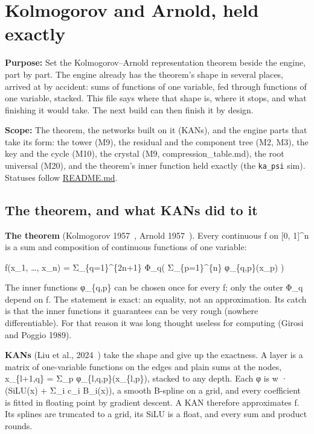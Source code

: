 \chapter{\texorpdfstring{Kolmogorov and Arnold, held exactly}{Kolmogorov and Arnold, held exactly}}
\label{chap:kolmogorov-arnold}

\textbf{Purpose:} Set the Kolmogorov–Arnold representation theorem beside the engine, part by part. The engine already has the theorem's shape in several places, arrived at by accident: sums of functions of one variable, fed through functions of one variable, stacked. This file says where that shape is, where it stops, and what finishing it would take. The next build can then finish it by design.

\textbf{Scope:} The theorem, the networks built on it (KANs), and the engine parts that take its form: the tower (M9), the residual and the component tree (M2, M3), the key and the cycle (M10), the crystal (M9, compression\_\allowbreak{}table.md), the root universal (M20), and the theorem's inner function held exactly (the \texttt{ka\_\allowbreak{}psi} sim). Statuses follow \hyperref[chap:readme]{README.md}.

\section{\texorpdfstring{The theorem, and what KANs did to it}{The theorem, and what KANs did to it}}

\textbf{The theorem} (Kolmogorov 1957~\cite{src:Kolmogorov-1957}, Arnold 1957~\cite{src:Arnold-1957}). Every continuous f on [0, 1]\textasciicircum{}n is a sum and composition of continuous functions of one variable:

f(x\_\allowbreak{}1, …, x\_\allowbreak{}n) = Σ\_\allowbreak{}\{q=1\}\textasciicircum{}\{2n+1\} Φ\_\allowbreak{}q( Σ\_\allowbreak{}\{p=1\}\textasciicircum{}\{n\} φ\_\allowbreak{}\{q,p\}(x\_\allowbreak{}p) )

The inner functions φ\_\allowbreak{}\{q,p\} can be chosen once for every f; only the outer Φ\_\allowbreak{}q depend on f. The statement is exact: an equality, not an approximation. Its catch is that the inner functions it guarantees can be very rough (nowhere differentiable). For that reason it was long thought useless for computing (Girosi and Poggio 1989).

\textbf{KANs} (Liu et al., 2024~\cite{src:Liu-et-al-2024}) take the shape and give up the exactness. A layer is a matrix of one-variable functions on the edges and plain sums at the nodes, x\_\allowbreak{}\{l+1,q\} = Σ\_\allowbreak{}p φ\_\allowbreak{}\{l,q,p\}(x\_\allowbreak{}\{l,p\}), stacked to any depth. Each φ is w · (SiLU(x) + Σ\_\allowbreak{}i c\_\allowbreak{}i B\_\allowbreak{}i(x)), a smooth B-spline on a grid, and every coefficient is fitted in floating point by gradient descent. A KAN therefore approximates f. Its splines are truncated to a grid, its SiLU is a float, and every sum and product rounds.


